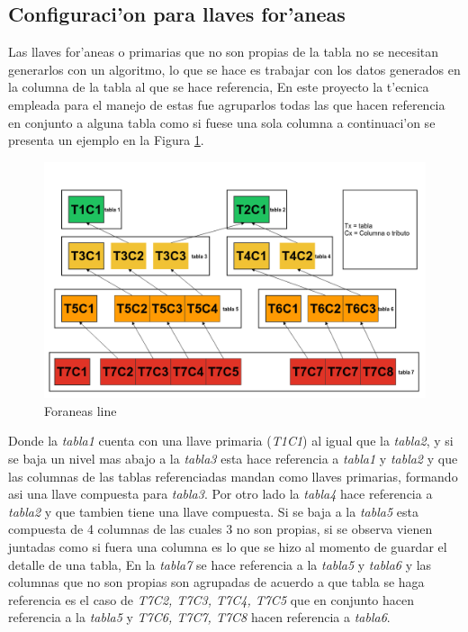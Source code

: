 \subsection{Configuraci'on para llaves for'aneas}
Las llaves for'aneas o primarias que no son propias de la tabla no se necesitan generarlos con un algoritmo, lo que se hace es trabajar con los datos generados en la columna de la tabla al que se hace referencia, En este proyecto la t'ecnica empleada para el manejo de estas fue agruparlos todas las que hacen referencia en conjunto a alguna tabla como si fuese una sola columna a continuaci'on se presenta un ejemplo en la Figura \ref{fig:ejemploForaneasLine}.
\begin{figure}[H]
\centering
\includegraphics[scale=0.4]{images/foraneasline.png}
\caption{Foraneas line}\label{fig:ejemploForaneasLine}
\end{figure}
Donde la \textit{tabla1} cuenta con una llave primaria (\textit{T1C1})  al igual que la \textit{tabla2}, y si se baja un nivel mas abajo a la \textit{tabla3} esta hace referencia a \textit{tabla1} y \textit{tabla2} y que las columnas de las tablas referenciadas mandan como llaves primarias, formando asi una llave compuesta para \textit{tabla3}. Por otro lado la \textit{tabla4} hace referencia a \textit{tabla2} y que tambien tiene una llave compuesta. Si se baja a la \textit{tabla5} esta compuesta de 4 columnas de las cuales 3 no son propias, si se observa vienen juntadas como si fuera una columna es lo que se hizo al momento de guardar el detalle de una tabla, En la \textit{tabla7} se hace referencia a la \textit{tabla5} y \textit{tabla6} y las columnas que no son propias son agrupadas de acuerdo a que tabla se haga referencia es el caso de \textit{T7C2, T7C3, T7C4, T7C5} que en conjunto hacen referencia a la \textit{tabla5} y \textit{T7C6, T7C7, T7C8} hacen referencia a \textit{tabla6}.

